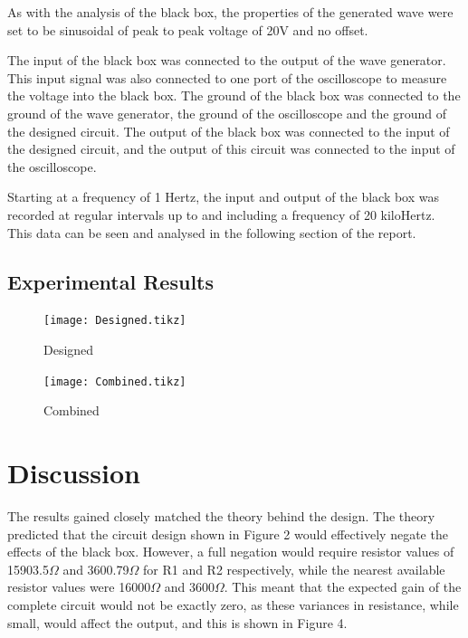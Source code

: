 \documentclass[12pt]{article} %
\begin{document}
As with the analysis of the black box, the properties of the generated wave were set to be sinusoidal of peak to peak voltage of 20V and no offset.

The input of the black box was connected to the output of the wave generator. This input signal was also connected to one port of the oscilloscope to measure the voltage into the black box. The ground of the black box was connected to the ground of the wave generator, the ground of the oscilloscope and the ground of the designed circuit. The output of the black box was connected to the input of the designed circuit, and the output of this circuit was connected to the input of the oscilloscope.

Starting at a frequency of 1 Hertz, the input and output of the black box was recorded at regular intervals up to and including a frequency of 20 kiloHertz. This data can be seen and analysed in the following section of the report.

\subsection{Experimental Results}



\begin{figure}
 	\centering
	\texttt{[image: Designed.tikz]}
	\caption{Designed}
\end{figure}

\begin{figure}
 	\centering
	\texttt{[image: Combined.tikz]}
	\caption{Combined}
\end{figure}

\pagebreak




\section{Discussion}

The results gained closely matched the theory behind the design. The theory predicted that the circuit design shown in Figure 2 would effectively negate the effects of the black box. However, a full negation would require resistor values of 15903.5$\Omega$ and 3600.79$\Omega$ for R1 and R2 respectively, while the nearest available resistor values were 16000$\Omega$ and 3600$\Omega$. This meant that the expected gain of the complete circuit would not be exactly zero, as these variances in resistance, while small, would affect the output, and this is shown in Figure 4.
\end{document}
